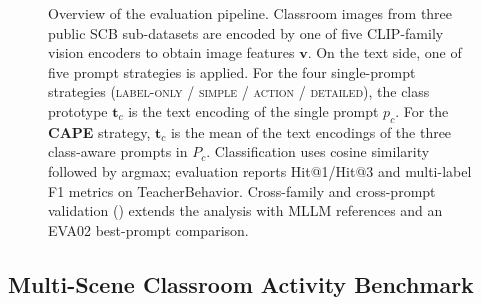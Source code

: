 \documentclass[symmetry,article,submit,pdftex,moreauthors]{Definitions/mdpi}
\begin{document}
\begin{figure}[H]
{%
}
\caption{Overview of the evaluation pipeline. Classroom images from three public SCB sub-datasets are encoded by one of five CLIP-family vision encoders to obtain image features $\mathbf{v}$. On the text side, one of five prompt strategies is applied. For the four single-prompt strategies (\textsc{label-only} / \textsc{simple} / \textsc{action} / \textsc{detailed}), the class prototype $\mathbf{t}_c$ is the text encoding of the single prompt $p_c$. For the \textbf{CAPE} strategy, $\mathbf{t}_c$ is the mean of the text encodings of the three class-aware prompts in $P_c$. Classification uses cosine similarity followed by argmax; evaluation reports Hit@1/Hit@3 and multi-label F1 metrics on TeacherBehavior. Cross-family and cross-prompt validation () extends the analysis with MLLM references and an EVA02 best-prompt comparison.}
\label{fig:framework}
\end{figure}

\subsection{Multi-Scene Classroom Activity Benchmark}
\label{sec:dataset}
\end{document}
